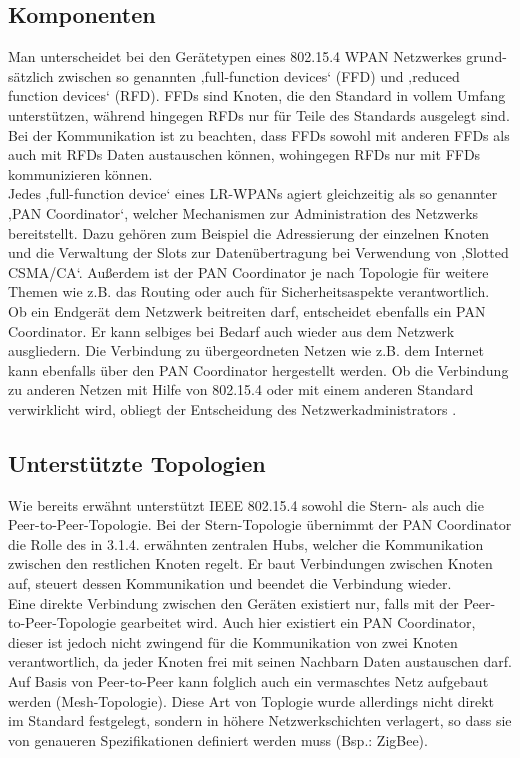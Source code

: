 \subsection{Komponenten}\label{ss:Komponenten}

Man unterscheidet bei den Gerätetypen eines 802.15.4 WPAN Netzwerkes grund-sätzlich zwischen so genannten ‚full-function devices‘ (FFD) und ‚reduced function devices‘ (RFD). FFDs sind Knoten, die den Standard in vollem Umfang unterstützen, während hingegen RFDs nur für Teile des Standards ausgelegt sind. Bei der Kommunikation ist zu beachten, dass FFDs sowohl mit anderen FFDs als auch mit RFDs Daten austauschen können, wohingegen RFDs nur mit FFDs kommunizieren können. \\
Jedes ‚full-function device‘ eines LR-WPANs agiert gleichzeitig als so genannter ‚PAN Coordinator‘, welcher Mechanismen zur Administration des Netzwerks bereitstellt. Dazu gehören zum Beispiel die Adressierung der einzelnen Knoten und die Verwaltung der Slots zur Datenübertragung bei Verwendung von ‚Slotted CSMA/CA‘. Außerdem ist der PAN Coordinator je nach Topologie für weitere Themen wie z.B. das Routing oder auch für Sicherheitsaspekte verantwortlich. \\
Ob ein Endgerät dem Netzwerk beitreiten darf, entscheidet ebenfalls ein PAN Coordinator. Er kann selbiges bei Bedarf auch wieder aus dem Netzwerk ausgliedern. Die Verbindung zu übergeordneten Netzen wie z.B. dem Internet kann ebenfalls über den PAN Coordinator hergestellt werden. Ob die Verbindung zu anderen Netzen mit Hilfe von 802.15.4 oder mit einem anderen Standard verwirklicht wird, obliegt der Entscheidung des Netzwerkadministrators \cite{d:hesse} \cite{d:ieee}.

\subsection{Unterstützte Topologien}\label{ss:UnterstutzeTopologien}

Wie bereits erwähnt unterstützt IEEE 802.15.4 sowohl die Stern- als auch die Peer-to-Peer-Topologie. Bei der Stern-Topologie übernimmt der PAN Coordinator die Rolle des in 3.1.4. erwähnten zentralen Hubs, welcher die Kommunikation zwischen den restlichen Knoten regelt. Er baut Verbindungen zwischen Knoten auf, steuert dessen Kommunikation und beendet die Verbindung wieder. \\
Eine direkte Verbindung zwischen den Geräten existiert nur, falls mit der Peer-to-Peer-Topologie gearbeitet wird. Auch hier existiert ein PAN Coordinator, dieser ist jedoch nicht zwingend für die Kommunikation von zwei Knoten verantwortlich, da jeder Knoten frei mit seinen Nachbarn Daten austauschen darf.  Auf Basis von Peer-to-Peer kann folglich auch ein vermaschtes Netz aufgebaut werden (Mesh-Topologie). Diese Art von Toplogie wurde allerdings nicht direkt im Standard festgelegt, sondern in höhere Netzwerkschichten verlagert, so dass sie von genaueren Spezifikationen definiert werden muss (Bsp.: ZigBee). 

